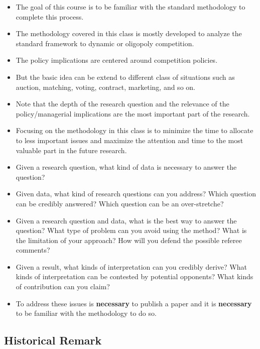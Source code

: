 \documentclass[]{book}
\providecommand{\tightlist}{%
  \setlength{\itemsep}{0pt}\setlength{\parskip}{0pt}}
\theoremstyle{definition}
\theoremstyle{definition}
\theoremstyle{definition}
\theoremstyle{remark}
\begin{document}
\begin{itemize}
\tightlist
\item
  The goal of this course is to be familiar with the standard
  methodology to complete this process.
\item
  The methodology covered in this class is mostly developed to analyze
  the standard framework to dynamic or oligopoly competition.
\item
  The policy implications are centered around competition policies.
\item
  But the basic idea can be extend to different class of situations such
  as auction, matching, voting, contract, marketing, and so on.
\item
  Note that the depth of the research question and the relevance of the
  policy/managerial implications are the most important part of the
  research.
\item
  Focusing on the methodology in this class is to minimize the time to
  allocate to less important issues and maximize the attention and time
  to the most valuable part in the future research.
\item
  Given a research question, what kind of data is necessary to answer
  the question?
\item
  Given data, what kind of research questions can you address? Which
  question can be credibly answered? Which question can be an
  over-stretche?
\item
  Given a research question and data, what is the best way to answer the
  question? What type of problem can you avoid using the method? What is
  the limitation of your approach? How will you defend the possible
  referee comments?
\item
  Given a result, what kinds of interpretation can you credibly derive?
  What kinds of interpretation can be contested by potential opponents?
  What kinds of contribution can you claim?
\item
  To address these issues is \textbf{necessary} to publish a paper and
  it is \textbf{necessary} to be familiar with the methodology to do so.
\end{itemize}

\subsection{Historical Remark}\label{historical-remark}
\end{document}
